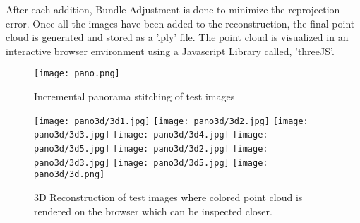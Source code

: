 \newline
\newline
 After each addition, Bundle Adjustment is done to minimize the reprojection error. Once all the images have been added to the reconstruction, the final point cloud is generated and stored as a '.ply' file. The point cloud is visualized in an interactive browser environment using a Javascript Library called, 'threeJS'.

\begin{figure}[H]
  \centering
  \texttt{[image: pano.png]}
  \caption{Incremental panorama stitching of test images}
  \label{pano}	
\end{figure}

\begin{figure}[H]
  \centering
  \texttt{[image: pano3d/3d1.jpg]}
  \texttt{[image: pano3d/3d2.jpg]}
  \texttt{[image: pano3d/3d3.jpg]}
  \texttt{[image: pano3d/3d4.jpg]}
  \texttt{[image: pano3d/3d5.jpg]}
  \texttt{[image: pano3d/3d2.jpg]}
  \texttt{[image: pano3d/3d3.jpg]}
  \texttt{[image: pano3d/3d5.jpg]}
  \texttt{[image: pano3d/3d.png]}
  \caption{3D Reconstruction of test images where colored point cloud is rendered on the browser which can be inspected closer.}
  \label{recon}	
\end{figure}

\pagebreak
